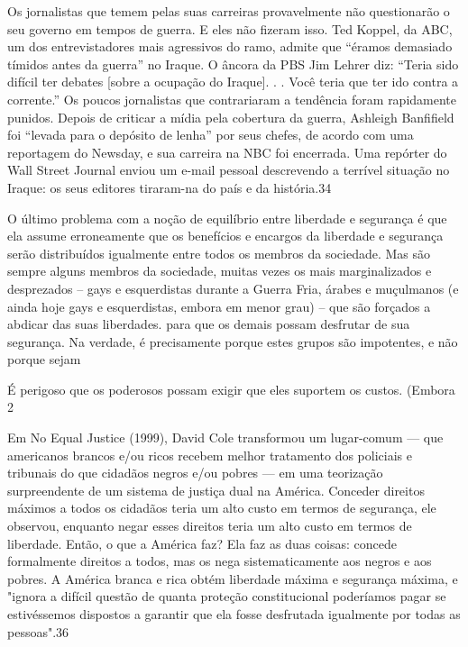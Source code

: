  \par 
Os jornalistas que temem pelas suas carreiras provavelmente não questionarão o seu governo em tempos de guerra. E eles não fizeram isso. Ted Koppel, da ABC, um dos entrevistadores mais agressivos do ramo, admite que “éramos demasiado tímidos antes da guerra” no Iraque. O âncora da PBS Jim Lehrer diz: “Teria sido difícil ter debates [sobre a ocupação do Iraque]. . . Você teria que ter ido contra a corrente.” Os poucos jornalistas que contrariaram a tendência foram rapidamente punidos. Depois de criticar a mídia pela cobertura da guerra, Ashleigh Banfifield foi “levada para o depósito de lenha” por seus chefes, de acordo com uma reportagem do Newsday, e sua carreira na NBC foi encerrada. Uma repórter do Wall Street Journal enviou um e-mail pessoal descrevendo a terrível situação no Iraque: os seus editores tiraram-na do país e da história.{\color{blue}34}
 \par 
O último problema com a noção de equilíbrio entre liberdade e segurança é que ela assume erroneamente que os benefícios e encargos da liberdade e segurança serão distribuídos igualmente entre todos os membros da sociedade. Mas são sempre alguns membros da sociedade, muitas vezes os mais marginalizados e desprezados – gays e esquerdistas durante a Guerra Fria, árabes e muçulmanos (e ainda hoje gays e esquerdistas, embora em menor grau) – que são forçados a abdicar das suas liberdades. para que os demais possam desfrutar de sua segurança. Na verdade, é precisamente porque estes grupos são impotentes, e não porque sejam
 \par 
É perigoso que os poderosos possam exigir que eles suportem os custos. (Embora 2%
 \par 
Em No Equal Justice (1999), David Cole transformou um lugar-comum — que americanos brancos e/ou ricos recebem melhor tratamento dos policiais e tribunais do que cidadãos negros e/ou pobres — em uma teorização surpreendente de um sistema de justiça dual na América. Conceder direitos máximos a todos os cidadãos teria um alto custo em termos de segurança, ele observou, enquanto negar esses direitos teria um alto custo em termos de liberdade. Então, o que a América faz? Ela faz as duas coisas: concede formalmente direitos a todos, mas os nega sistematicamente aos negros e aos pobres. A América branca e rica obtém liberdade máxima e segurança máxima, e "ignora a difícil questão de quanta proteção constitucional poderíamos pagar se estivéssemos dispostos a garantir que ela fosse desfrutada igualmente por todas as pessoas".{\color{blue}36}
